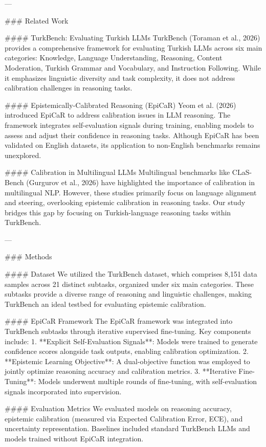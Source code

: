 ---

### Related Work  

#### TurkBench: Evaluating Turkish LLMs
TurkBench (Toraman et al., 2026) provides a comprehensive framework for evaluating Turkish LLMs across six main categories: Knowledge, Language Understanding, Reasoning, Content Moderation, Turkish Grammar and Vocabulary, and Instruction Following. While it emphasizes linguistic diversity and task complexity, it does not address calibration challenges in reasoning tasks.

#### Epistemically-Calibrated Reasoning (EpiCaR)
Yeom et al. (2026) introduced EpiCaR to address calibration issues in LLM reasoning. The framework integrates self-evaluation signals during training, enabling models to assess and adjust their confidence in reasoning tasks. Although EpiCaR has been validated on English datasets, its application to non-English benchmarks remains unexplored.

#### Calibration in Multilingual LLMs
Multilingual benchmarks like CLaS-Bench (Gurgurov et al., 2026) have highlighted the importance of calibration in multilingual NLP. However, these studies primarily focus on language alignment and steering, overlooking epistemic calibration in reasoning tasks. Our study bridges this gap by focusing on Turkish-language reasoning tasks within TurkBench.

---

### Methods  

#### Dataset
We utilized the TurkBench dataset, which comprises 8,151 data samples across 21 distinct subtasks, organized under six main categories. These subtasks provide a diverse range of reasoning and linguistic challenges, making TurkBench an ideal testbed for evaluating epistemic calibration.

#### EpiCaR Framework
The EpiCaR framework was integrated into TurkBench subtasks through iterative supervised fine-tuning. Key components include:  
1. **Explicit Self-Evaluation Signals**: Models were trained to generate confidence scores alongside task outputs, enabling calibration optimization.  
2. **Epistemic Learning Objective**: A dual-objective function was employed to jointly optimize reasoning accuracy and calibration metrics.  
3. **Iterative Fine-Tuning**: Models underwent multiple rounds of fine-tuning, with self-evaluation signals incorporated into supervision.

#### Evaluation Metrics
We evaluated models on reasoning accuracy, epistemic calibration (measured via Expected Calibration Error, ECE), and uncertainty representation. Baselines included standard TurkBench LLMs and models trained without EpiCaR integration.

